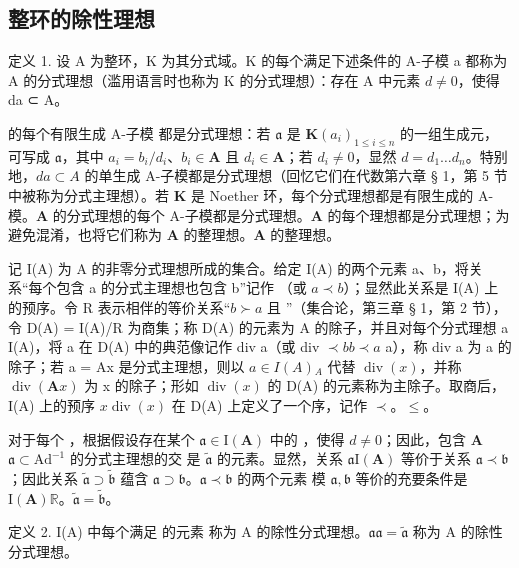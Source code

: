 \subsection{整环的除性理想}

定义 1. 设 A 为整环，K 为其分式域。K 的每个满足下述条件的 A-子模 a 都称为 A 的分式理想（滥用语言时也称为 K 的分式理想）：存在 A 中元素 \(d \neq 0\)，使得 da ⊂ A。

 的每个有限生成 A-子模  都是分式理想：若 \(\mathfrak{a}\) 是 \(\mathbf{K}\)\((a_{i})_{1\leqslant i\leqslant n}\) 的一组生成元，可写成 \(\mathfrak{a}\)，其中 \(a_{i} = b_{i} / d_{i}\)、\(b_{i}\in \mathbf{A}\) 且 \(d_{i}\in \mathbf{A}\)；若 \(d_{i}\neq 0\)，显然 \(d = d_{1}\ldots d_{n}\)。特别地，\(da\subset A\) 的单生成 A-子模都是分式理想（回忆它们在代数第六章 § 1，第 5 节中被称为分式主理想）。若 \(\mathbf{K}\) 是 Noether 环，每个分式理想都是有限生成的 A-模。\(\mathbf{A}\) 的分式理想的每个 A-子模都是分式理想。\(\mathbf{A}\) 的每个理想都是分式理想；为避免混淆，也将它们称为 \(\mathbf{A}\) 的整理想。\(\mathbf{A}\) 的整理想。

记 I(A) 为 A 的非零分式理想所成的集合。给定 I(A) 的两个元素 a、b，将关系“每个包含 a 的分式主理想也包含 b”记作 （或 \(a \prec b\)）；显然此关系是 I(A) 上的预序。令 R 表示相伴的等价关系“\(b \succ a\) 且 ”（集合论，第三章 § 1，第 2 节），令 D(A) = I(A)/R 为商集；称 D(A) 的元素为 A 的除子，并且对每个分式理想 a  I(A)，将 a 在 D(A) 中的典范像记作 div a（或 div \(\prec b\)\(b \prec a\) a），称 div a 为 a 的除子；若 a = Ax 是分式主理想，则以 \(a \in I(A)\)\(_{A}\) 代替 \(\operatorname{div}(x)\)，并称 \(\operatorname{div}(\mathbf{A}x)\) 为 x 的除子；形如 \(\operatorname{div}(x)\) 的 D(A) 的元素称为主除子。取商后，I(A) 上的预序 \(x\)\(\operatorname{div}(x)\) 在 D(A) 上定义了一个序，记作 \(\prec\)。\(\leqslant\)。

对于每个 ，根据假设存在某个 \(\mathfrak{a} \in \mathrm{I}(\mathbf{A})\) 中的 ，使得 \(d \neq 0\)；因此，包含 \(\mathbf{A}\)\(\mathfrak{a} \subset \mathrm{Ad}^{-1}\) 的分式主理想的交  是 \(\tilde{\mathfrak{a}}\) 的元素。显然，关系 \(\mathfrak{a}\)\(\mathrm{I}(\mathbf{A})\) 等价于关系 \(\mathfrak{a} \prec \mathfrak{b}\)；因此关系 \(\tilde{\mathfrak{a}} \supset \tilde{\mathfrak{b}}\) 蕴含 \(\mathfrak{a} \supset \mathfrak{b}\)。\(\mathfrak{a} \prec \mathfrak{b}\) 的两个元素  模 \(\mathfrak{a}, \mathfrak{b}\) 等价的充要条件是 \(\mathrm{I}(\mathbf{A})\)\(\mathbb{R}\)。\(\tilde{\mathfrak{a}} = \tilde{\mathfrak{b}}\)。

定义 2. I(A) 中每个满足  的元素  称为 A 的除性分式理想。\(\mathfrak{a}\)\(\mathfrak{a} = \tilde{\mathfrak{a}}\) 称为 A 的除性分式理想。

